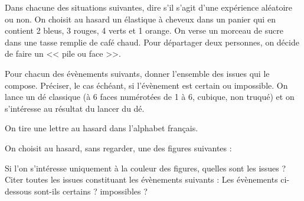 \documentclass[../Cours.tex]{subfiles}
\begin{document}
\clearpage
\EXERCICES
\begin{questions}
    \exercice Dans chacune des situations suivantes, dire s'il s'agit d'une expérience aléatoire ou non.
    \question On choisit au hasard un élastique à cheveux dans un panier qui en contient 2 bleus, 3 rouges, 4 verts et 1 orange.
    \question On verse un morceau de sucre dans une tasse remplie de café chaud.
    \question Pour départager deux personnes, on décide de faire un << pile ou face >>.
    
    \exercice Pour chacun des évènements suivants, donner l'ensemble des issues qui le compose. Préciser, le cas échéant, si l'évènement est certain ou impossible.
    \question On lance un dé classique (à 6 faces numérotées de 1 à 6, cubique, non truqué) et on s'intéresse au résultat du lancer du dé.

    \question On tire une lettre au hasard dans l'alphabet français.

    \exercice On choisit au hasard, sans regarder, une des figures suivantes :
    \begin{center}
    \end{center}

    \question Si l'on s'intéresse uniquement à la couleur des figures, quelles sont les issues ?
    \question Citer toutes les issues constituant les évènements suivants :
    \question Les évènements ci-dessous sont-ils certains ? impossibles ?


\end{questions}
\end{document}
